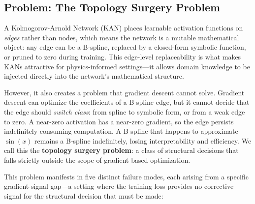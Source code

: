 \documentclass[11pt,a4paper]{article}
\begin{document}
\subsection{Problem: The Topology Surgery Problem}

A Kolmogorov-Arnold Network (KAN) places learnable activation functions on
\emph{edges} rather than nodes, which means the network is a mutable mathematical
object: any edge can be a B-spline, replaced by a closed-form symbolic function, or
pruned to zero during training. This edge-level replaceability is what makes KANs
attractive for physics-informed settings---it allows domain knowledge to be injected
directly into the network's mathematical structure.

However, it also creates a problem that gradient descent cannot solve. Gradient descent
can optimize the coefficients of a B-spline edge, but it cannot decide that the edge
should \emph{switch class}: from spline to symbolic form, or from a weak edge to zero.
A near-zero activation has a near-zero gradient, so the edge persists indefinitely
consuming computation. A B-spline that happens to approximate $\sin(x)$ remains a
B-spline indefinitely, losing interpretability and efficiency. We call this the
\textbf{topology surgery problem}: a class of structural decisions that falls strictly
outside the scope of gradient-based optimization.

This problem manifests in five distinct failure modes, each arising from a specific
gradient-signal gap---a setting where the training loss provides no corrective signal
for the structural decision that must be made:
\end{document}
